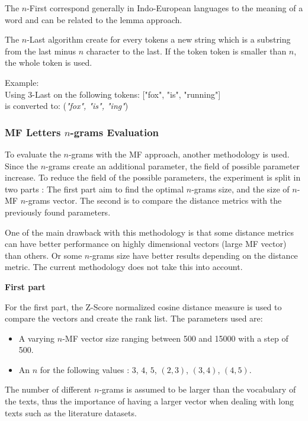 The $n$-First correspond generally in Indo-European languages to the meaning of a word and can be related to the lemma approach.

\begin{definition}[$n$-Last]
  \label{def:n_last}
  The $n$-Last algorithm create for every tokens a new string which is a substring from the last minus $n$ character to the last.
  If the token token is smaller than $n$, the whole token is used.

  Example: \\
  Using $3$-Last on the following tokens: ["fox", "is", "running"] \\
  is converted to: (\textit{"fox", "is", "ing"})
\end{definition}

\subsubsection{MF Letters $n$-grams Evaluation}

To evaluate the $n$-grams with the MF approach, another methodology is used.
Since the $n$-grams create an additional parameter, the field of possible parameter increase.
To reduce the field of the possible parameters, the experiment is split in two parts :
The first part aim to find the optimal $n$-grams size, and the size of $n$-MF $n$-grams vector.
The second is to compare the distance metrics with the previously found parameters.

One of the main drawback with this methodology is that some distance metrics can have better performance on highly dimensional vectors (large MF vector) than others.
Or some $n$-grams size have better results depending on the distance metric.
The current methodology does not take this into account.

\textbf{First part}

For the first part, the Z-Score normalized cosine distance measure is used to compare the vectors and create the rank list.
The parameters used are:

\begin{itemize}
  \item
  A varying $n$-MF vector size ranging between 500 and 15000 with a step of 500.
  \item
  An $n$ for the following values : $3$, $4$, $5$, $(2, 3)$, $(3, 4)$, $(4, 5)$.
\end{itemize}

The number of different $n$-grams is assumed to be larger than the vocabulary of the texts, thus the importance of having a larger vector when dealing with long texts such as the literature datasets.

